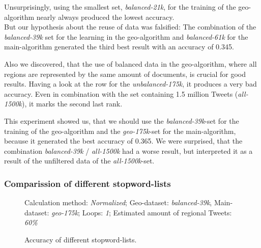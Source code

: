 \documentclass[../Main.tex]{subfiles}
\begin{document}
Unsurprisingly, using the smallest set, \emph{balanced-21k}, for the training of the geo-algorithm nearly always produced the lowest accuracy. \\
But our hypothesis about the reuse of data was falsified:  The combination of the \emph{balanced-39k} set for the learning in the geo-algorithm and \emph{balanced-61k} for the main-algorithm generated the third best result with an accuracy of 0.345.

Also we discovered, that the use of balanced data  in the geo-algorithm, where all regions are represented by the same amount of documents, is crucial for good results. Having a look at the row for the \emph{unbalanced-175k}, it produces a very bad accuracy. Even in combination with the set containing 1.5 million Tweets (\emph{all-1500k}), it marks the second last rank.

This experiment showed us, that we should use the \emph{balanced-39k}-set for the training of the geo-algorithm and the \emph{geo-175k}-set for the main-algorithm, because it generated the best accuracy of 0.365. We were surprised, that the combination \emph{balanced-39k} / \emph{all-1500k} had a worse result, but interpreted it as a result of the unfiltered data of the \emph{all-1500k}-set.

\subsubsection{Comparission of different stopword-lists}
\begin{figure}
\begin{center}
\end{center}
  \label{geo_graph1}
Calculation method: \textit{Normalized}; Geo-dataset: \textit{balanced-39k}, Main-dataset: \textit{geo-175k}; Loops: \textit{1}; Estimated amount of regional Tweets: \textit{60\%}
  \caption{Accuracy of different stopword-lists.}

\end{figure}
\end{document}
